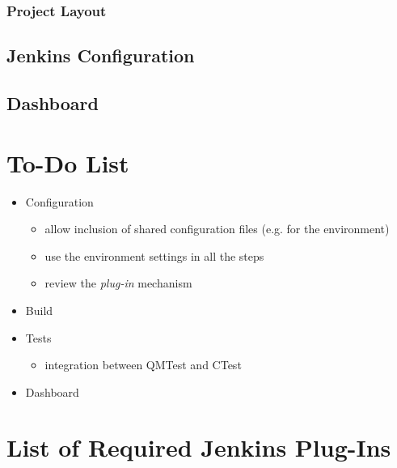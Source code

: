 \documentclass{lhcbnote}
\begin{document}
\subsubsection{Project Layout}


\subsection{Jenkins Configuration}

\subsection{Dashboard}

\section{To-Do List}
\begin{itemize}
  \item Configuration
  \begin{itemize}
    \item allow inclusion of shared configuration files (e.g. for the
environment)
    \item use the environment settings in all the steps
    \item review the \emph{plug-in} mechanism
  \end{itemize}
  \item Build
  \item Tests
  \begin{itemize}
    \item integration between QMTest and CTest
  \end{itemize}
  \item Dashboard
\end{itemize}





%


\appendix
\section{List of Required Jenkins Plug-Ins}
\end{document}
